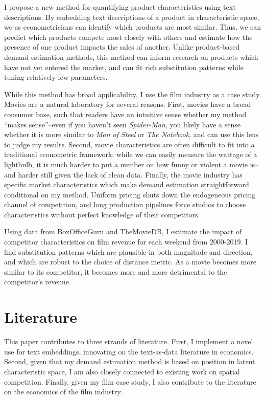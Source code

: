 \documentclass{article}
\begin{document}
I propose a new method for quantifying product characteristics using text descriptions. By embedding text descriptions of a product in characteristic space, we as econometricians can identify which products are most similar. Thus, we can predict which products compete most closely with others and estimate how the presence of one product impacts the sales of another. Unlike product-based demand estimation methods, this method can inform research on products which have not yet entered the market, and can fit rich substitution patterns while tuning relatively few parameters.

While this method has broad applicability, I use the film industry as a case study. Movies are a natural laboratory for several reasons. First, movies have a broad consumer base, such that readers have an intuitive sense whether my method ``makes sense''--even if you haven't seen \emph{Spider-Man}, you likely have a sense whether it is more similar to \emph{Man of Steel} or \emph{The Notebook}, and can use this lens to judge my results. Second, movie characteristics are often difficult to fit into a traditional econometric framework: while we can easily measure the wattage of a lightbulb, it is much harder to put a number on how funny or violent a movie is--and harder still given the lack of clean data. Finally, the movie industry has specific market characteristics which make demand estimation straightforward conditional on my method. Uniform pricing shuts down the endogeneous pricing channel of competition, and long production pipelines force studios to choose characteristics without perfect knowledge of their competitors.

Using data from BoxOfficeGuru and TheMovieDB, I estimate the impact of competitor characteristics on film revenue for each weekend from 2000-2019. I find substitution patterns which are plausible in both magnitude and direction, and which are robust to the choice of distance metric. As a movie becomes more similar to its competitor, it becomes more and more detrimental to the competitor's revenue. 

\section{Literature}

This paper contributes to three strands of literature. First, I implement a novel use for text embeddings, innovating on the text-as-data literature in economics. Second, given that my demand estimation method is based on position in latent characteristic space, I am also closely connected to existing work on spatial competition. Finally, given my film case study, I also contribute to the literature on the economics of the film industry. 
\end{document}
